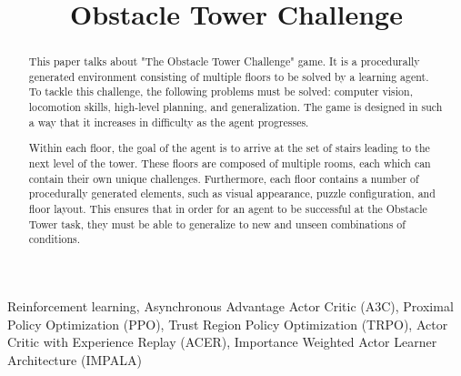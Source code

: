 \documentclass[conference]{IEEEtran}
\begin{document}
\title{Obstacle Tower Challenge}

\author{
\and
{}
\and
{}
\and
{}
}

\maketitle

\begin{abstract}
This paper talks about "The Obstacle Tower Challenge" game. It is a procedurally generated environment consisting of multiple floors to be solved by a learning agent. To tackle this challenge, the following problems must be solved: computer vision, locomotion skills, high-level planning, and generalization. The game is designed in such a way that it increases in difficulty as the agent progresses.

Within each floor, the goal of the agent is to arrive at the set of stairs leading to the next level of the tower. These floors are composed of multiple rooms, each which can contain their own unique challenges. Furthermore, each floor contains a number of procedurally generated elements, such as visual appearance, puzzle configuration, and floor layout. This ensures that in order for an agent to be successful at the Obstacle Tower task, they must be able to generalize to new and unseen combinations of conditions.
\end{abstract}

\begin{IEEEkeywords}
Reinforcement learning, Asynchronous Advantage Actor Critic (A3C), Proximal Policy Optimization (PPO), Trust Region Policy Optimization (TRPO), Actor Critic with Experience Replay (ACER), Importance Weighted Actor Learner Architecture (IMPALA)
\end{IEEEkeywords}
\end{document}
